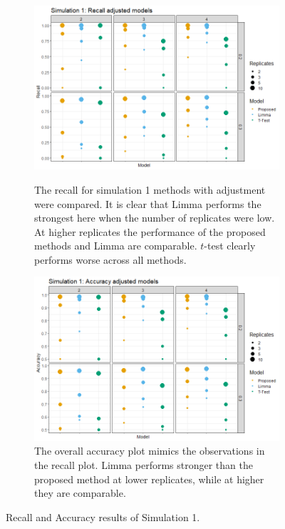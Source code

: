 \documentclass{mcp}
\begin{document}
\begin{figure}[h!]
\centering
 \begin{subfigure}{\textwidth}
  \centering
	\includegraphics[width=.8\textwidth]{sim_new/sim1_Recall}\\
	\caption{The recall for simulation 1 methods with adjustment were compared. It is clear that Limma performs the strongest here when the number of replicates were low.  At higher replicates the performance of the proposed methods and Limma are comparable. $t$-test clearly performs worse across all methods.}
 \end{subfigure}
 \begin{subfigure}{\textwidth}
  \centering
	\includegraphics[width=.8\textwidth]{sim_new/sim1_accuracy}
	\caption{The overall accuracy plot mimics the observations in the recall plot. Limma performs stronger than the proposed method at lower replicates, while at higher they are comparable.}
 \end{subfigure}
\caption{Recall and Accuracy results of Simulation 1.}
\label{fig:sim1_recall}
\end{figure}
\end{document}
